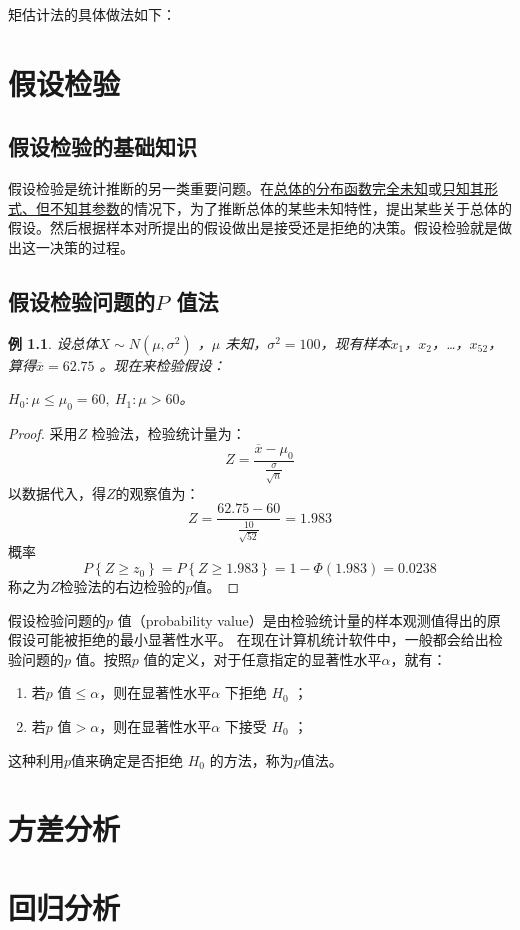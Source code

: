 \documentclass[11pt]{book}
\newtheorem{exercise}{\hspace{2em}\textbf{例}}[section]
\newcounter{#2}
\newcounter{#2}[#1]
\numberwithin{#2}{#1}
\begin{document}
矩估计法的具体做法如下：






	\chapter{假设检验}
	\section{假设检验的基础知识}
	假设检验是统计推断的另一类重要问题。在\uline{总体的分布函数完全未知}或\uline{只知其形式、但不知其参数}的情况下，为了推断总体的某些未知特性，提出某些关于总体的假设。然后根据样本对所提出的假设做出是接受还是拒绝的决策。假设检验就是做出这一决策的过程。
	
	
	\section{假设检验问题的$ P $ 值法}
	\begin{exercise}
	设总体$ X \sim N(\mu ,\sigma ^{2})$ ，$ \mu $ 未知，$ \sigma ^{2}=100 $，现有样本$ x_1 $，$ x_2 $，\dots ，$ x_{52} $，算得$ \overline{x} = 62.75$ 。现在来检验假设：
	\begin{center}
		$ H_0:\mu \le \mu _0=60,\ H_1 :\mu >60 $。
	\end{center}
\end{exercise}

\begin{proof}
	采用$ Z $ 检验法，检验统计量为：
	\begin{equation*}
		Z=\frac{\overline{x} - \mu_0}{\frac{\sigma}{\sqrt{n}}}
	\end{equation*}
	以数据代入，得$Z$的观察值为：
	\begin{equation*}
		Z=\frac{62.75 - 60}{\frac{10}{\sqrt{52}}}=1.983
	\end{equation*}
	概率
	\begin{equation*}
		P\left\lbrace Z \ge z_0\right\rbrace =P\left\lbrace Z\ge1.983\right\rbrace =1-\Phi(1.983)=0.0238
	\end{equation*}
	称之为$Z$检验法的右边检验的$p$值。
\end{proof}
\begin{newdef}
	假设检验问题的$ p $ 值（probability value）是由检验统计量的样本观测值得出的原假设可能被拒绝的最小显著性水平。
	在现在计算机统计软件中，一般都会给出检验问题的$ p $ 值。按照$ p $ 值的定义，对于任意指定的显著性水平$ \alpha $，就有：
	
	\begin{enumerate}
		\item 若$ p $ 值$ \le \alpha $，则在显著性水平$ \alpha $ 下拒绝 $ H_0 $ ；
		\item 若$ p $ 值$ > \alpha $，则在显著性水平$ \alpha $ 下接受 $ H_0 $ ；
	\end{enumerate}
这种利用$p$值来确定是否拒绝 $ H_0 $ 的方法，称为$p$值法。
\end{newdef}


	\chapter{方差分析}
	\chapter{回归分析}
	
	
\end{document}
